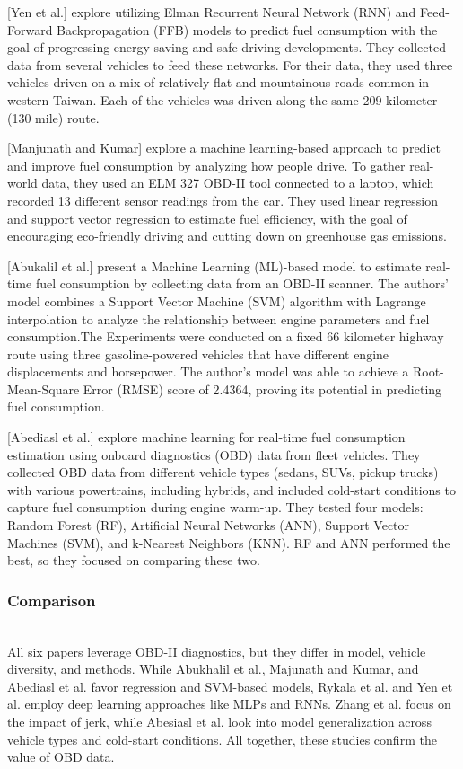 \documentclass[letterpaper]{article}
\begin{document}
[Yen et al.] explore utilizing Elman Recurrent Neural
Network (RNN) and Feed-Forward Backpropagation (FFB) models to predict fuel
consumption with the goal of progressing energy-saving and safe-driving
developments. They collected data from several vehicles to feed these networks.
For their data, they used three vehicles driven on a mix of relatively flat and
mountainous roads common in western Taiwan. Each of the vehicles was driven
along the same 209 kilometer (130 mile) route. 

[Manjunath and Kumar] explore a
machine learning-based approach to predict and improve fuel consumption by
analyzing how people drive. To gather real-world data, they used an ELM 327
OBD-II tool connected to a laptop, which recorded 13 different sensor readings
from the car. They used linear regression and support vector regression to
estimate fuel efficiency, with the goal of encouraging eco-friendly driving and
cutting down on greenhouse gas emissions. 

[Abukalil et al.] present a Machine
Learning (ML)-based model to estimate real-time fuel consumption by collecting
data from an OBD-II scanner. The authors' model combines a Support Vector
Machine (SVM) algorithm with Lagrange interpolation to analyze the relationship
between engine parameters and fuel consumption.The Experiments were conducted on
a fixed 66 kilometer highway route using three gasoline-powered vehicles that
have different engine displacements and horsepower. The author's model was able
to achieve a Root-Mean-Square Error (RMSE) score of 2.4364, proving its
potential in predicting fuel consumption. 

[Abediasl et al.] explore machine
learning for real-time fuel consumption estimation using onboard diagnostics
(OBD) data from fleet vehicles. They collected OBD data from different vehicle
types (sedans, SUVs, pickup trucks) with various powertrains, including hybrids,
and included cold-start conditions to capture fuel consumption during engine
warm-up. They tested four models: Random Forest (RF), Artificial Neural Networks
(ANN), Support Vector Machines (SVM), and k-Nearest Neighbors (KNN). RF and ANN
performed the best, so they focused on comparing these two. 

\subsubsection*{Comparison}~\\
All six papers leverage OBD-II diagnostics, but they differ in model, vehicle diversity,
and methods. While Abukhalil et al., Majunath and Kumar, and Abediasl et al.
favor regression and SVM-based models, Rykala et al. and Yen et al. employ deep
learning approaches like MLPs and RNNs. Zhang et al. focus on the impact of jerk,
while Abesiasl et al. look into model generalization across vehicle types and
cold-start conditions. All together, these studies confirm the value of OBD data.
\end{document}
